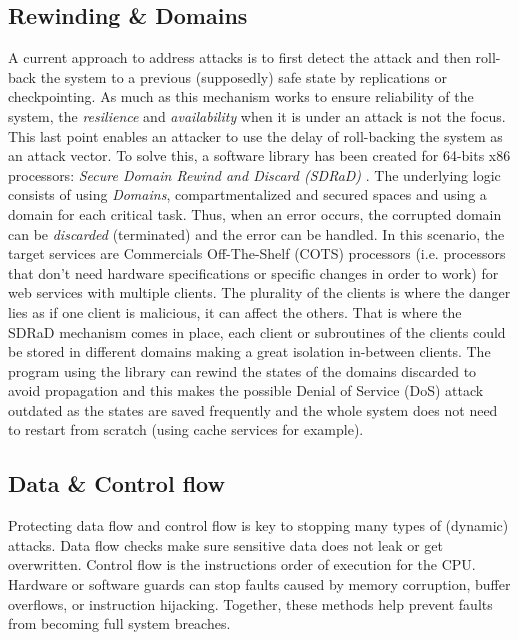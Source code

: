 \documentclass[11pt,a4paper]{report}
\begin{document}
\subsection{Rewinding \& Domains}
A current approach to address attacks is to first detect the attack and then roll-back the system to a previous (supposedly) safe state by replications or checkpointing. 
As much as this mechanism works to ensure reliability of the system, the \textit{resilience} and \textit{availability} when it is under an attack is not the focus. 
This last point enables an attacker to use the delay of roll-backing the system as an attack vector. 
To solve this, a software library has been created for 64-bits x86 processors: \textit{Secure Domain Rewind and Discard (SDRaD)} \cite{sdrad}. 
The underlying logic consists of using \textit{Domains}, compartmentalized and secured spaces and using a domain for each critical task. 
Thus, when an error occurs, the corrupted domain can be \textit{discarded} (terminated) and the error can be handled. 
In this scenario, the target services are Commercials Off-The-Shelf (COTS) processors \cite{sdrad, fault-detection-survey, future-research} (i.e. processors that don't need hardware specifications or specific changes in order to work) for web services with multiple clients. The plurality of the clients is where the danger lies as if one client is malicious, it can affect the others. 
That is where the SDRaD mechanism comes in place, each client or subroutines of the clients could be stored in different domains making a great isolation in-between clients. 
The program using the library can rewind the states of the domains discarded to avoid propagation and this makes the possible Denial of Service (DoS) attack outdated as the states are saved frequently and the whole system does not need to restart from scratch (using cache services for example). 


\subsection{Data \& Control flow}
Protecting data flow and control flow is key to stopping many types of (dynamic) attacks. 
Data flow checks make sure sensitive data does not leak or get overwritten. 
Control flow is the instructions order of execution for the CPU. 
Hardware or software guards can stop faults caused by memory corruption, buffer overflows, or instruction hijacking. 
Together, these methods help prevent faults from becoming full system breaches.
\end{document}
